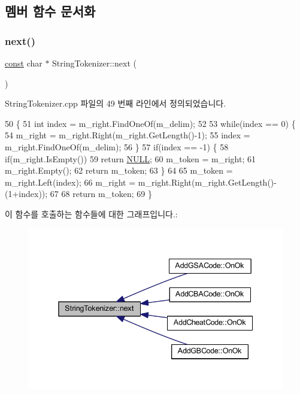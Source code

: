\subsection{멤버 함수 문서화}
\mbox{\label{class_string_tokenizer_abeba9010a819d5d0bf8436894f71f049}} 
\subsubsection{\texorpdfstring{next()}{next()}}
{\footnotesize\ttfamily \mbox{\hyperlink{getopt1_8c_a2c212835823e3c54a8ab6d95c652660e}{const}} char $\ast$ String\+Tokenizer\+::next (\begin{DoxyParamCaption}{ }\end{DoxyParamCaption})}



String\+Tokenizer.\+cpp 파일의 49 번째 라인에서 정의되었습니다.


\begin{DoxyCode}
50 \{
51   \textcolor{keywordtype}{int} index = m\_right.FindOneOf(m\_delim);
52   
53   \textcolor{keywordflow}{while}(index == 0) \{
54     m\_right = m\_right.Right(m\_right.GetLength()-1);
55     index = m\_right.FindOneOf(m\_delim);
56   \}
57   \textcolor{keywordflow}{if}(index == -1) \{
58     \textcolor{keywordflow}{if}(m\_right.IsEmpty())
59       \textcolor{keywordflow}{return} \mbox{\hyperlink{getopt1_8c_a070d2ce7b6bb7e5c05602aa8c308d0c4}{NULL}};
60     m\_token = m\_right;
61     m\_right.Empty();
62     \textcolor{keywordflow}{return} m\_token;
63   \}
64 
65   m\_token = m\_right.Left(index);
66   m\_right = m\_right.Right(m\_right.GetLength()-(1+index));
67 
68   \textcolor{keywordflow}{return} m\_token;
69 \}
\end{DoxyCode}
이 함수를 호출하는 함수들에 대한 그래프입니다.\+:
\nopagebreak
\begin{figure}[H]
\begin{center}
\leavevmode
\includegraphics[width=338pt]{class_string_tokenizer_abeba9010a819d5d0bf8436894f71f049_icgraph}
\end{center}
\end{figure}


